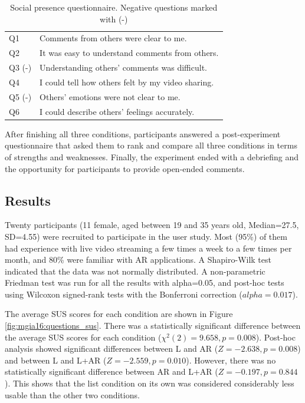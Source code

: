 \begin{table}[h]
  \centering
  \caption{Social presence questionnaire. Negative questions marked with (-)}
  \label{table:social_questions}
  \begin{tabular}{ll}
    Q1 & Comments from others were clear to me.          \\
    Q2 & It was easy to understand comments from others. \\
    Q3 (-) & Understanding others' comments was difficult.  \\
    Q4 & I could tell how others felt by my video sharing.\\
    Q5 (-) & Others' emotions were not clear to me.\\
    Q6 & I could describe others' feelings accurately.
  \end{tabular}
\end{table}


After finishing all three conditions, participants answered a post-experiment questionnaire that asked them to rank and compare all three conditions in terms of strengths and weaknesses. Finally, the experiment ended with a debriefing and the opportunity for participants to provide open-ended comments.

\subsection{Results}

Twenty participants (11 female, aged between 19 and 35 years old, Median=27.5, SD=4.55) were recruited to participate in the user study. Most (95\%) of them had experience with live video streaming a few times a week to a few times per month, and 80\% were familiar with AR applications. A Shapiro-Wilk test indicated that the data was not normally distributed. A non-parametric Friedman test was run for all the results with alpha=0.05, and post-hoc tests using Wilcoxon signed-rank tests with the Bonferroni correction ($alpha=0.017$).

The average SUS scores for each condition are shown in Figure \ref{fig:mgia16:questions_sus}. There was a statistically significant difference between the average SUS scores for each condition ($\chi^2(2)=9.658, p=0.008$). Post-hoc analysis showed significant differences between L and AR ($Z=-2.638, p=0.008$) and between L and L+AR ($Z=-2.559, p=0.010$). However, there was no statistically significant difference between AR and L+AR ($Z=-0.197, p=0.844$). This shows that the list condition on its own was considered considerably less usable than the other two conditions.


